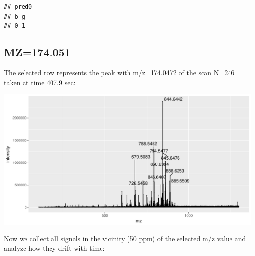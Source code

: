 \documentclass[]{article}
\newenvironment{Shaded}{\begin{snugshade}}{\end{snugshade}}
\newcommand{\KeywordTok}[1]{\textcolor[rgb]{0.13,0.29,0.53}{\textbf{#1}}}
\newcommand{\FloatTok}[1]{\textcolor[rgb]{0.00,0.00,0.81}{#1}}
\newcommand{\StringTok}[1]{\textcolor[rgb]{0.31,0.60,0.02}{#1}}
\newcommand{\OperatorTok}[1]{\textcolor[rgb]{0.81,0.36,0.00}{\textbf{#1}}}
\newcommand{\NormalTok}[1]{#1}
\begin{document}
\begin{verbatim}
## pred0
## b g 
## 0 1
\end{verbatim}

\subsection{MZ=174.051}\label{mz174.051}

\begin{Shaded}
\end{Shaded}

The selected row represents the peak with m/z=174.0472 of the scan N=246
taken at time 407.9 sec:

\begin{Shaded}
\end{Shaded}

\includegraphics{Supplementary_document_files/figure-latex/ion.plots.174-1.pdf}

Now we collect all signals in the vicinity (50 ppm) of the selected m/z
value and analyze how they drift with time:

\begin{Shaded}
\end{Shaded}
\end{document}
